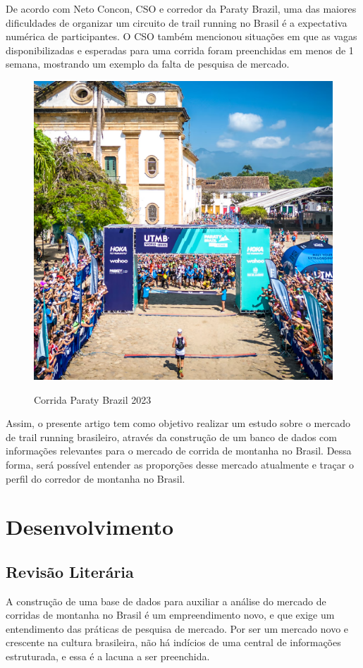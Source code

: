 De acordo com Neto Concon, CSO e corredor da Paraty Brazil, uma das maiores dificuldades de organizar um circuito de trail running no Brasil é a expectativa numérica de participantes. O CSO também mencionou situações em que as vagas disponibilizadas e esperadas para uma corrida foram preenchidas em menos de 1 semana, mostrando um exemplo da falta de pesquisa de mercado.

\begin{figure}
    \centering
    \caption{Corrida Paraty Brazil 2023}
    \includegraphics[width = 0.5\linewidth]{relatorios/paraty/figuras/image4.png}
    \label{fig:paraty}
\end{figure}

Assim, o presente artigo tem como objetivo realizar um estudo sobre o mercado de trail running brasileiro, através da construção de um banco de dados com informações relevantes para o mercado de corrida de montanha no Brasil. Dessa forma, será possível entender as proporções desse mercado atualmente e traçar o perfil do corredor de montanha no Brasil.

\section{Desenvolvimento}

\subsection{Revisão Literária}

A construção de uma base de dados para auxiliar a análise do mercado de corridas de montanha no Brasil é um empreendimento novo, e que exige um entendimento das práticas de pesquisa de mercado. Por ser um mercado novo e crescente na cultura brasileira, não há indícios de uma central de informações estruturada, e essa é a lacuna a ser preenchida.

